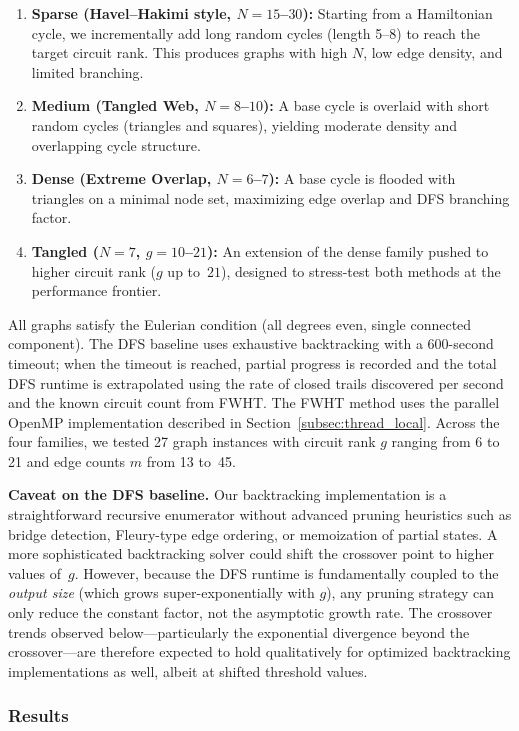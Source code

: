 \documentclass[acmsmall,review]{acmart}
\begin{document}
	\begin{enumerate}
		\item \textbf{Sparse (Havel--Hakimi style, $N = 15$--$30$):} Starting from a Hamiltonian cycle, we incrementally add long random cycles (length 5--8) to reach the target circuit rank. This produces graphs with high $N$, low edge density, and limited branching.
		\item \textbf{Medium (Tangled Web, $N = 8$--$10$):} A base cycle is overlaid with short random cycles (triangles and squares), yielding moderate density and overlapping cycle structure.
		\item \textbf{Dense (Extreme Overlap, $N = 6$--$7$):} A base cycle is flooded with triangles on a minimal node set, maximizing edge overlap and DFS branching factor.
		\item \textbf{Tangled ($N = 7$, $g = 10$--$21$):} An extension of the dense family pushed to higher circuit rank ($g$ up to~$21$), designed to stress-test both methods at the performance frontier.
	\end{enumerate}
	
	All graphs satisfy the Eulerian condition (all degrees even, single connected component). The DFS baseline uses exhaustive backtracking with a 600-second timeout; when the timeout is reached, partial progress is recorded and the total DFS runtime is extrapolated using the rate of closed trails discovered per second and the known circuit count from FWHT. The FWHT method uses the parallel OpenMP implementation described in Section~\ref{subsec:thread_local}. Across the four families, we tested 27 graph instances with circuit rank $g$ ranging from 6 to 21 and edge counts $m$ from 13 to~45.
	
	\textbf{Caveat on the DFS baseline.} Our backtracking implementation is a straightforward recursive enumerator without advanced pruning heuristics such as bridge detection, Fleury-type edge ordering, or memoization of partial states. A more sophisticated backtracking solver could shift the crossover point to higher values of~$g$. However, because the DFS runtime is fundamentally coupled to the \emph{output size} (which grows super-exponentially with $g$), any pruning strategy can only reduce the constant factor, not the asymptotic growth rate. The crossover trends observed below---particularly the exponential divergence beyond the crossover---are therefore expected to hold qualitatively for optimized backtracking implementations as well, albeit at shifted threshold values.
	
	\subsubsection{Results}
	
\end{document}
